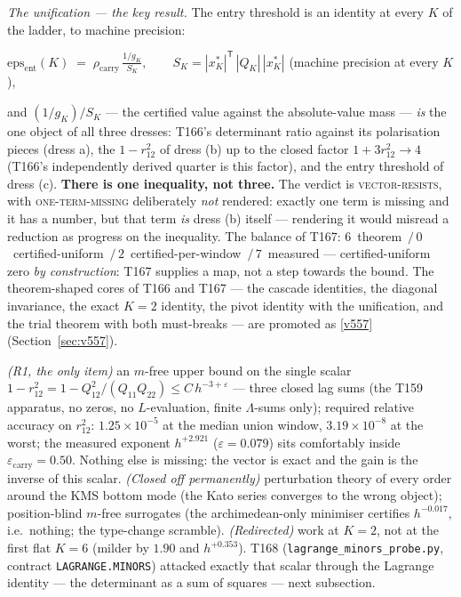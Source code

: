 \documentclass[11pt,a4paper]{article}
\begin{document}
\emph{The unification --- the key result.} The entry threshold is an
identity at every $K$ of the ladder, to machine precision:
\begin{keyeq}$\displaystyle
\mathrm{eps}_{\mathrm{ent}}(K)\;=\;\rho_{\mathrm{carry}}\,
\frac{1/g_K}{S_K},\qquad
S_K=|x^*_K|^{\mathsf T}\,|Q_K|\,|x^*_K|$
\quad(machine precision at every $K$),
\end{keyeq}
\noindent and $(1/g_K)/S_K$ --- the certified value against the
absolute-value mass --- \emph{is} the one object of all three dresses:
T166's determinant ratio against its polarisation pieces (dress a), the
$1-r_{12}^2$ of dress (b) up to the closed factor $1+3r_{12}^2\to4$
(T166's independently derived quarter is this factor), and the entry
threshold of dress (c). \textbf{There is one inequality, not three.} The
verdict is \textsc{vector-resists}, with \textsc{one-term-missing}
deliberately \emph{not} rendered: exactly one term is missing and it has a
number, but that term \emph{is} dress (b) itself --- rendering it would
misread a reduction as progress on the inequality. The balance of T167:
$6$~theorem~$/\,0$~certified-uniform~$/\,2$~certified-per-window~$/\,
7$~measured --- certified-uniform zero \emph{by construction}: T167
supplies a map, not a step towards the bound. The theorem-shaped cores of
T166 and T167 --- the cascade identities, the diagonal invariance, the
exact $K=2$ identity, the pivot identity with the unification, and the
trial theorem with both must-breaks --- are promoted as \vref{v557}
 (Section~\ref{sec:v557}).

\begin{keybox}
\emph{(R1, the only item)} an $m$-free upper bound on the single scalar
$1-r_{12}^2=1-Q_{12}^2/(Q_{11}Q_{22})\le C\,h^{-3+\varepsilon}$ --- three
closed lag sums (the T159 apparatus, no zeros, no $L$-evaluation, finite
$\Lambda$-sums only); required relative accuracy on $r_{12}^2$:
$1.25\times10^{-5}$ at the median union window, $3.19\times10^{-8}$ at the
worst; the measured exponent $h^{+2.921}$ ($\varepsilon=0.079$) sits
comfortably inside $\varepsilon_{\mathrm{carry}}=0.50$. Nothing else is
missing: the vector is exact and the gain is the inverse of this scalar.
\emph{(Closed off permanently)} perturbation theory of every order around
the KMS bottom mode (the Kato series converges to the wrong object);
position-blind $m$-free surrogates (the archimedean-only minimiser
certifies $h^{-0.017}$, i.e.\ nothing; the type-change scramble).
\emph{(Redirected)} work at $K=2$, not at the first flat $K=6$ (milder by
$1.90$ and $h^{+0.353}$). T168 (\texttt{lagrange\_minors\_probe.py},
contract \texttt{LAGRANGE.MINORS}) attacked exactly that scalar through the
Lagrange identity --- the determinant as a sum of squares --- next
subsection.
\end{keybox}
\end{document}
